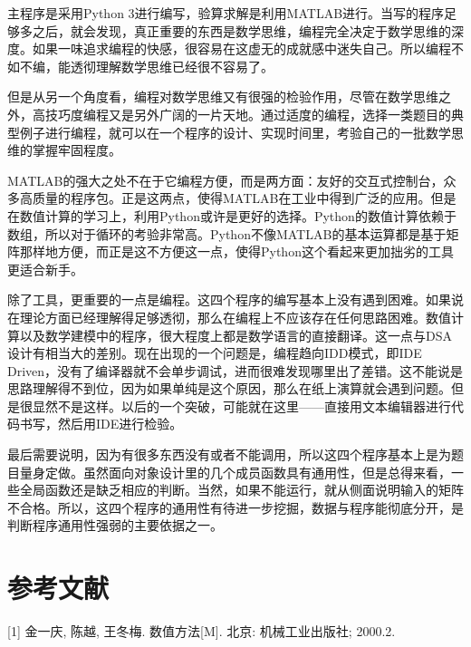\documentclass[UTF8, a4paper, zihao=-4, bibliography=totoc]{ctexart}
\begin{document}
主程序是采用Python 3进行编写，验算求解是利用MATLAB进行。当写的程序足够多之后，就会发现，真正重要的东西是数学思维，编程完全决定于数学思维的深度。如果一味追求编程的快感，很容易在这虚无的成就感中迷失自己。所以编程不如不编，能透彻理解数学思维已经很不容易了。

但是从另一个角度看，编程对数学思维又有很强的检验作用，尽管在数学思维之外，高技巧度编程又是另外广阔的一片天地。通过适度的编程，选择一类题目的典型例子进行编程，就可以在一个程序的设计、实现时间里，考验自己的一批数学思维的掌握牢固程度。

MATLAB的强大之处不在于它编程方便，而是两方面：友好的交互式控制台，众多高质量的程序包。正是这两点，使得MATLAB在工业中得到广泛的应用。但是在数值计算的学习上，利用Python或许是更好的选择。Python的数值计算依赖于数组，所以对于循环的考验非常高。Python不像MATLAB的基本运算都是基于矩阵那样地方便，而正是这不方便这一点，使得Python这个看起来更加拙劣的工具更适合新手。

除了工具，更重要的一点是编程。这四个程序的编写基本上没有遇到困难。如果说在理论方面已经理解得足够透彻，那么在编程上不应该存在任何思路困难。数值计算以及数学建模中的程序，很大程度上都是数学语言的直接翻译。这一点与DSA设计有相当大的差别。现在出现的一个问题是，编程趋向IDD模式，即IDE Driven，没有了编译器就不会单步调试，进而很难发现哪里出了差错。这不能说是思路理解得不到位，因为如果单纯是这个原因，那么在纸上演算就会遇到问题。但是很显然不是这样。以后的一个突破，可能就在这里——直接用文本编辑器进行代码书写，然后用IDE进行检验。

最后需要说明，因为有很多东西没有或者不能调用，所以这四个程序基本上是为题目量身定做。虽然面向对象设计里的几个成员函数具有通用性，但是总得来看，一些全局函数还是缺乏相应的判断。当然，如果不能运行，就从侧面说明输入的矩阵不合格。所以，这四个程序的通用性有待进一步挖掘，数据与程序能彻底分开，是判断程序通用性强弱的主要依据之一。

\section{参考文献}

[1] 金一庆, 陈越, 王冬梅. 数值方法[M]. 北京: 机械工业出版社; 2000.2.
\end{document}
